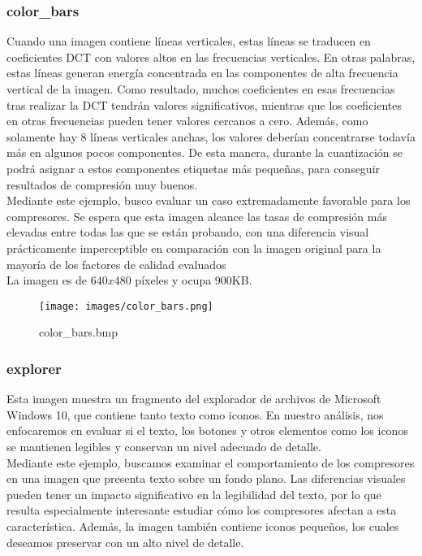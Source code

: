 \documentclass[12pt,a4paper]{article}
\begin{document}
\subsubsection{color\_bars}
Cuando una imagen contiene líneas verticales, estas líneas se traducen en coeficientes DCT con valores altos en las frecuencias verticales. En otras palabras, estas líneas generan energía concentrada en las componentes de alta frecuencia vertical de la imagen. Como resultado, muchos coeficientes en esas frecuencias tras realizar la DCT tendrán valores significativos, mientras que los coeficientes en otras frecuencias pueden tener valores cercanos a cero. Además, como solamente hay 8 líneas verticales anchas, los valores deberían concentrarse todavía más en algunos pocos componentes. De esta manera, durante la cuantización se podrá asignar a estos componentes etiquetas más pequeñas, para conseguir resultados de compresión muy buenos.\\

Mediante este ejemplo, busco evaluar un caso extremadamente favorable para los compresores. Se espera que esta imagen alcance las tasas de compresión más elevadas entre todas las que se están probando, con una diferencia visual prácticamente imperceptible en comparación con la imagen original para la mayoría de los factores de calidad evaluados\\  

La imagen es de $640x480$ píxeles y ocupa 900KB.\\
 
\begin{figure}[H]
    \centering
    \texttt{[image: images/color\_bars.png]}
    \caption{color\_bars.bmp}
    
\end{figure}

\subsubsection{explorer}
Esta imagen muestra un fragmento del explorador de archivos de Microsoft Windows 10, que contiene tanto texto como iconos. En nuestro análisis, nos enfocaremos en evaluar si el texto, los botones y otros elementos como los iconos se mantienen legibles y conservan un nivel adecuado de detalle.\\

Mediante este ejemplo, buscamos examinar el comportamiento de los compresores en una imagen que presenta texto sobre un fondo plano. Las diferencias visuales pueden tener un impacto significativo en la legibilidad del texto, por lo que resulta especialmente interesante estudiar cómo los compresores afectan a esta característica. Además, la imagen también contiene iconos pequeños, los cuales deseamos preservar con un alto nivel de detalle.\\
\end{document}
